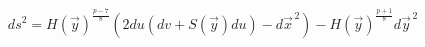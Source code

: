 \begin{equation}
ds^{2}=H\left( \vec{y}\right) ^{\frac{p-7}{8}}\left( 2du\left( dv+S\left(
\vec{y}\right) du\right) -d\vec{x}^{\,2}\right) -H\left( \vec{y}\right) ^{\frac{p+1}{8}}d%
\vec{y}^{\,2}
\end{equation}

